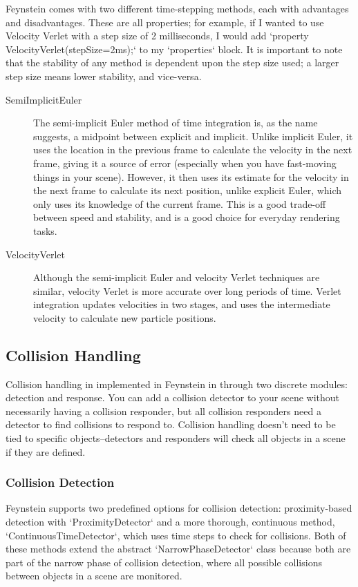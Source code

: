 Feynstein comes with two different time-stepping methods, each with
advantages and disadvantages. These are all properties; for example,
if I wanted to use Velocity Verlet with a step size of 2 milliseconds,
I would add `property VelocityVerlet(stepSize=2ms);` to my `properties`
block. It is important to note that the stability of any method is
dependent upon the step size used; a larger step size means lower
stability, and vice-versa.

\begin{description}
\item[SemiImplicitEuler] The semi-implicit Euler method of time integration
  is, as the name suggests, a midpoint between explicit and
  implicit. Unlike implicit Euler, it uses the location in the
  previous frame to calculate the velocity in the next frame, giving
  it a source of error (especially when you have fast-moving things in
  your scene). However, it then uses its estimate for the velocity in
  the next frame to calculate its next position, unlike explicit
  Euler, which only uses its knowledge of the current frame. This is a
  good trade-off between speed and stability, and is a good choice for
  everyday rendering tasks.

\item[VelocityVerlet] Although the semi-implicit Euler and velocity 
Verlet techniques are similar, velocity Verlet is more accurate over
long periods of time. Verlet integration updates velocities in two stages, and
uses the intermediate velocity to calculate new particle positions.
\end{description}

\subsection{Collision Handling}
Collision handling in implemented in Feynstein in through two discrete modules: detection and response. You can add a collision detector to your scene without necessarily having a collision responder, but all collision responders need a detector to find collisions to respond to. Collision handling doesn't need to be tied to specific objects--detectors and responders will check all objects in a scene if they are defined.

\subsubsection{Collision Detection}
Feynstein supports two predefined options for collision detection: proximity-based detection with `ProximityDetector` and a more thorough, continuous method, `ContinuousTimeDetector`, which uses time steps to check for collisions. Both of these methods extend the abstract `NarrowPhaseDetector` class because both are part of the narrow phase of collision detection, where all possible collisions between objects in a scene are monitored.

